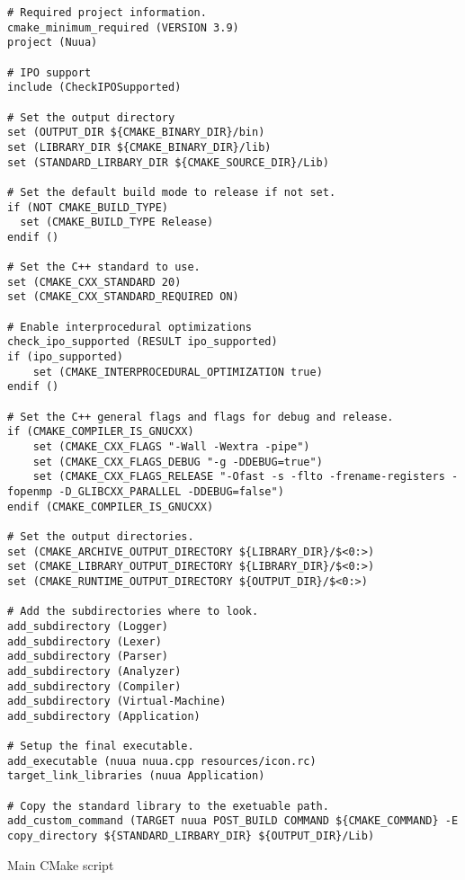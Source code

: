 \begin{code}
\begin{verbatim}
# Required project information.
cmake_minimum_required (VERSION 3.9)
project (Nuua)

# IPO support
include (CheckIPOSupported)

# Set the output directory
set (OUTPUT_DIR ${CMAKE_BINARY_DIR}/bin)
set (LIBRARY_DIR ${CMAKE_BINARY_DIR}/lib)
set (STANDARD_LIRBARY_DIR ${CMAKE_SOURCE_DIR}/Lib)

# Set the default build mode to release if not set.
if (NOT CMAKE_BUILD_TYPE)
  set (CMAKE_BUILD_TYPE Release)
endif ()

# Set the C++ standard to use.
set (CMAKE_CXX_STANDARD 20)
set (CMAKE_CXX_STANDARD_REQUIRED ON)

# Enable interprocedural optimizations
check_ipo_supported (RESULT ipo_supported)
if (ipo_supported)
    set (CMAKE_INTERPROCEDURAL_OPTIMIZATION true)
endif ()

# Set the C++ general flags and flags for debug and release.
if (CMAKE_COMPILER_IS_GNUCXX)
    set (CMAKE_CXX_FLAGS "-Wall -Wextra -pipe")
    set (CMAKE_CXX_FLAGS_DEBUG "-g -DDEBUG=true")
    set (CMAKE_CXX_FLAGS_RELEASE "-Ofast -s -flto -frename-registers -fopenmp -D_GLIBCXX_PARALLEL -DDEBUG=false")
endif (CMAKE_COMPILER_IS_GNUCXX)

# Set the output directories.
set (CMAKE_ARCHIVE_OUTPUT_DIRECTORY ${LIBRARY_DIR}/$<0:>)
set (CMAKE_LIBRARY_OUTPUT_DIRECTORY ${LIBRARY_DIR}/$<0:>)
set (CMAKE_RUNTIME_OUTPUT_DIRECTORY ${OUTPUT_DIR}/$<0:>)

# Add the subdirectories where to look.
add_subdirectory (Logger)
add_subdirectory (Lexer)
add_subdirectory (Parser)
add_subdirectory (Analyzer)
add_subdirectory (Compiler)
add_subdirectory (Virtual-Machine)
add_subdirectory (Application)

# Setup the final executable.
add_executable (nuua nuua.cpp resources/icon.rc)
target_link_libraries (nuua Application)

# Copy the standard library to the exetuable path.
add_custom_command (TARGET nuua POST_BUILD COMMAND ${CMAKE_COMMAND} -E copy_directory ${STANDARD_LIRBARY_DIR} ${OUTPUT_DIR}/Lib)
\end{verbatim}
\caption{Main CMake script}
\label{ls:cmake}
\end{code}
